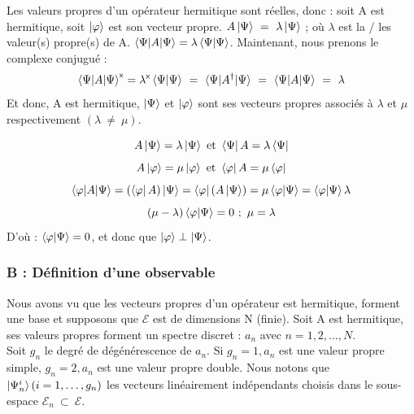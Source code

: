 \documentclass[12pt,a4paper,titlepage]{book}
\begin{document}
Les valeurs propres d'un opérateur hermitique sont réelles, donc : soit A est hermitique, soit $\ket{\varphi}$ est son vecteur propre. $A \ket{\Psi} ~=~ \lambda \ket{\Psi}$ ; où $\lambda$ est la / les valeur(s) propre(s) de A. $\braket{\Psi | A | \Psi} = \lambda \braket{\Psi | \Psi}$. Maintenant, nous prenons le complexe conjugué :\\
\begin{equation*}
\braket{\Psi | A | \Psi}^{\mathsf{x}} = \lambda^{\mathsf{x}} \braket{\Psi | \Psi} ~=~ \braket{\Psi | A^{\dagger} | \Psi} ~=~ \braket{\Psi | A | \Psi} ~=~ \lambda
\end{equation*}
Et donc, A est hermitique, $\ket{\Psi}$ et $\ket{\varphi}$ sont ses vecteurs propres associés à $\lambda$ et $\mu$ respectivement $(\lambda ~\neq~ \mu)$.

\begin{equation*}
A \ket{\Psi} = \lambda \ket{\Psi} ~\text{et}~ \bra{\Psi} A = \lambda \bra{\Psi} 
\end{equation*}
\begin{equation*}
A \ket{\varphi} = \mu \ket{\varphi} ~\text{et}~ \bra{\varphi} A = \mu \bra{\varphi} 
\end{equation*}
\begin{equation*}
\braket{\varphi | A | \Psi} = (\bra{\varphi} A)\ket{\Psi} = \bra{\varphi} (A \ket{\Psi}) = \mu \braket{\varphi | \Psi} = \braket{\varphi | \Psi} \lambda
\end{equation*}
\begin{equation*}
(\mu - \lambda) \braket{\varphi | \Psi} = 0 ~;~ \mu = \lambda
\end{equation*}
D'où : $\braket{\varphi | \Psi} = 0$, et donc que $\ket{\varphi} \perp \ket{\Psi}$.
\subsubsection{B : Définition d'une observable}

Nous avons vu que les vecteurs propres d'un opérateur est hermitique, forment une base et supposons que $\mathcal{E}$ est de dimensions N (finie). Soit A est hermitique, ses valeurs propres forment un spectre discret : $a_n$ avec $n = 1, 2, \ldots, N$.\\

Soit $g_n$ le degré de dégénérescence de $a_n$. Si $g_n = 1, a_n$ est une valeur propre simple, $g_n = 2, a_n$ est une valeur propre double. Nous notons que $\ket{\Psi_n^i} (i = 1, \ldots, g_n)$ les vecteurs linéairement indépendants choisis dans le sous-espace $\mathcal{E}_n ~\subset~ \mathcal{E}$.\\
\end{document}
